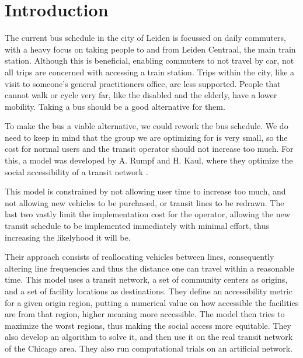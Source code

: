 \begin{abstract}
    This study expands on an article about optimizing the equity of social accessibility of a transit network \cite{rumpf}. It does so by comparing two methods of dividing a study area in community regions, and applies this method to the municipality of Leiden, a city in the Netherlands. The two methods are by postal code and by Voronoi diagram, with bus stops as weight  points. The Voronoi method is almost universally better in terms of performance metrics when applying the algorithm developed in \cite{rumpf}. Direct conclusion that this method is always better cannot be made, as other factors can still have a large influence on the outcome of the algorithm.
\end{abstract}

\chapter{Introduction}
The current bus schedule in the city of Leiden is focussed on daily commuters, with a heavy focus on taking people to and from Leiden Centraal, the main train station. Although this is beneficial, enabling commuters to not travel by car, not all trips are concerned with accessing a train station. Trips within the city, like a visit to someone's general practitioners office, are less supported. People that cannot walk or cycle very far, like the disabled and the elderly, have a lower mobility. Taking a bus should be a good alternative for them.

To make the bus a viable alternative, we could rework the bus schedule. We do need to keep in mind that the group we are optimizing for is very small, so the cost for normal users and the transit operator should not increase too much. For this, a model was developed by A. Rumpf and H. Kaul, where they optimize the social accessibility of a transit network \cite{rumpf}.

This model is constrained by not allowing user time to increase too much, and not allowing new vehicles to be purchased, or transit lines to be redrawn. The last two vastly limit the implementation cost for the operator, allowing the new transit schedule to be implemented immediately with minimal effort, thus increasing the likelyhood it will be.

Their approach consists of reallocating vehicles between lines, consequently altering line frequencies and thus the distance one can travel within a reasonable time. This model uses a transit network, a set of community centers as origins, and a set of facility locations as destinations. They define an accessibility metric for a given origin region, putting a numerical value on how accessible the facilities are from that region, higher meaning more accessible. The model then tries to maximize the worst regions, thus making the social access more equitable. They also develop an algorithm to solve it, and then use it on the real transit network of the Chicago area. They also run computational trials on an artificial network.

